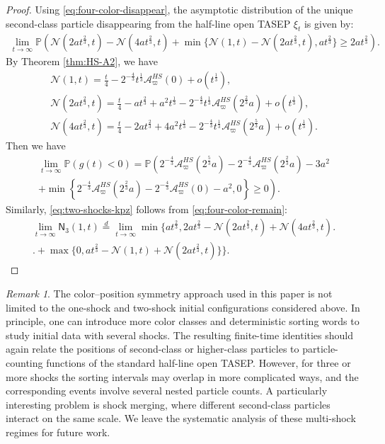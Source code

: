 \documentclass[12pt,a4paper]{amsart}
\theoremstyle{remark}
\newtheorem{remark}[theorem]{Remark}
\numberwithin{equation}{section} \numberwithin{theorem}{section}
\begin{document}
\begin{proof}
Using \eqref{eq:four-color-disappear}, the asymptotic distribution of the unique second-class particle disappearing from the half-line open TASEP $\xi_t$ is given by:
\begin{align}
\lim_{t\to\infty}\mathbb{P}(\mathcal{N}(2at^{\frac23},t)-\mathcal{N}(4at^{\frac23},t)+\min \{\mathcal{N}(1,t)-\mathcal{N}(2at^{\frac23},t), at^{\frac23}\} \geq 2at^{\frac23}).
\end{align}
By Theorem \ref{thm:HS-A2}, we have 
\begin{align*}
\mathcal{N}(1,t)=\frac{t}{4}-2^{-\frac{4}{3}}t^{\frac{1}{3}}\mathcal{A}_{\varpi}^{HS}(0)+o(t^{\frac{1}{3}}),\\
\mathcal{N}(2at^{\frac23},t)=\frac{t}{4}-a t^{\frac23}+a^2 t^{\frac13}-2^{-\frac{4}{3}}t^{\frac{1}{3}}\mathcal{A}_{\varpi}^{HS}(2^{\frac23}a)+o(t^{\frac{1}{3}}),\\
\mathcal{N}(4at^{\frac23},t)=\frac{t}{4}-2a t^{\frac23}+4a^2 t^{\frac13}-2^{-\frac{4}{3}}t^{\frac{1}{3}}\mathcal{A}_{\varpi}^{HS}(2^{\frac53}a)+o(t^{\frac{1}{3}}).
\end{align*}
Then we have 
\begin{multline*}
\lim_{t \to \infty}\mathbb{P}(g(t)<0)  = \mathbb{P}\left(2^{-\frac{4}{3}}\mathcal{A}_{\varpi}^{HS}(2^{\frac53}a)-2^{-\frac{4}{3}}\mathcal{A}_{\varpi}^{HS}(2^{\frac23}a) - 3a^2\right.\\
\left. + \min\left\{2^{-\frac{4}{3}}\mathcal{A}_{\varpi}^{HS}(2^{\frac23}a)-2^{-\frac{4}{3}}\mathcal{A}_{\varpi}^{HS}(0) - a^2,0 \right\} \geq 0\right).
\end{multline*}
Similarly, \eqref{eq:two-shocks-kpz} follows from \eqref{eq:four-color-remain}:
\begin{multline*}
\lim_{t \to \infty}\mathsf{N}_{3} (1,t)  \stackrel{d}{=}\lim_{t \to \infty} \min \bigl\{a t^{\frac23}, 2a t^{\frac23}-\mathcal{N}(2a t^{\frac23},t)+\mathcal{N}(4a t^{\frac23},t)\bigr.\\
\bigl.+\max\{0, a t^{\frac23}-\mathcal{N}(1,t)+\mathcal{N}(2a t^{\frac23},t)\}\bigr\}.
\end{multline*}
\end{proof}


\begin{remark}
The color--position symmetry approach used in this paper is not limited to the one-shock and two-shock initial configurations considered above. 
In principle, one can introduce more color classes and deterministic sorting words to study initial data with several shocks. 
The resulting finite-time identities should again relate the positions of second-class or higher-class particles to particle-counting functions of the standard half-line open TASEP. 
However, for three or more shocks the sorting intervals may overlap in more complicated ways, and the corresponding events involve several nested particle counts. 
A particularly interesting problem is shock merging, where different second-class particles interact on the same scale. 
We leave the systematic analysis of these multi-shock regimes for future work.
\end{remark}
\end{document}
